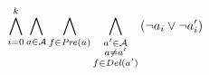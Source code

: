 {\begin{enumerate}
\[ \bigwedge\limits_{\substack{i=0}}^{k} \bigwedge\limits_{\substack{a \in \mathcal{A}}} \bigwedge\limits_{\substack{f\in \mathit{Pre}(a)}} \bigwedge\limits_{\substack{a' \in \mathcal{A} \\ a \neq a' \\ f \in \mathit{Del}(a')}}\left(\neg a_{i} \vee \neg a'_{i}\right) \]
\end{enumerate}

}